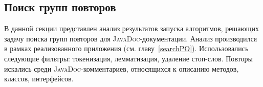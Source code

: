 



\subsection{Поиск групп повторов}
В данной секции представлен анализ результатов запуска алгоритмов, решающих задачу поиска групп повторов для \textsc{JavaDoc}-документации.
Анализ производился в рамках реализованного приложения (см. главу~\ref{searchPO}).
Использовались следующие фильтры: токенизация, лемматизация, удаление стоп-слов.
Повторы искались среди \textsc{JavaDoc}-комментариев, относящихся к описанию методов, классов, интерфейсов.

